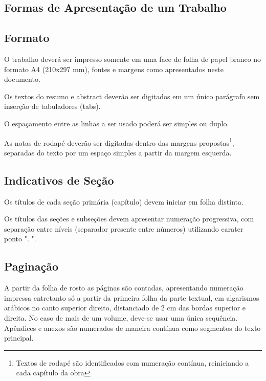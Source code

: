 \documentclass[repeatfields,xlists,xpacks,oneside,yearsonly]{ufrgscca}
\begin{document}
\begin{appendix}
        \chapter{Formas de Apresentação de um Trabalho}
        \label{formas}

        \section{Formato}

        O trabalho deverá ser impresso somente em uma face de folha de papel
        branco no formato A4 (210x297 mm), fontes e margens como apresentados neste documento.

        Os textos do resumo e abstract deverão ser digitados em um único parágrafo
        sem inserção de tabuladores (tabs).

        O espaçamento entre as linhas a ser usado poderá ser simples ou duplo.

        As notas de rodapé deverão ser digitadas dentro das margens
        propostas\footnote{Textos de rodapé são identificados com numeração
            contínua, reiniciando a cada capítulo da obra}, separadas do texto por um
        espaço simples a partir da margem esquerda.

        \section{Indicativos de Seção}

        Os títulos de cada seção primária (capítulo) devem iniciar em folha
        distinta.

        Os títulos das seções e subseções devem apresentar numeração progressiva,
        com separação entre níveis (separador presente entre números) utilizando
        carater ponto ". ".

        \section{Paginação}

        A partir da folha de rosto as páginas são contadas, apresentando numeração
        impressa entretanto só a partir da primeira folha da parte textual, em
        algarismos arábicos no canto superior direito, distanciado de 2 cm das
        bordas superior e direita. No caso de mais de um volume, deve-se usar uma
        única sequência. Apêndices e anexos são numerados de maneira contínua como
        segmentos do texto principal.


\end{appendix}
\end{document}
